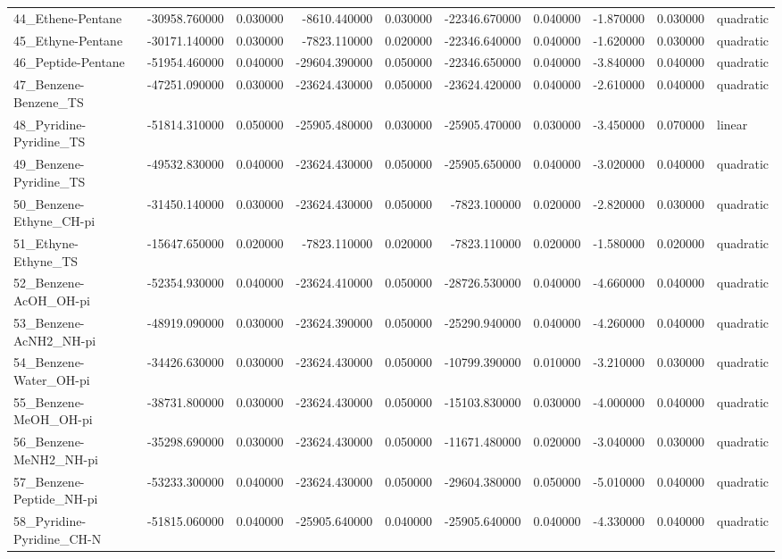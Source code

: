 \begin{tabular}{lrrrrrrrrl}
44_Ethene-Pentane & -30958.760000 & 0.030000 & -8610.440000 & 0.030000 & -22346.670000 & 0.040000 & -1.870000 & 0.030000 & quadratic \\
45_Ethyne-Pentane & -30171.140000 & 0.030000 & -7823.110000 & 0.020000 & -22346.640000 & 0.040000 & -1.620000 & 0.030000 & quadratic \\
46_Peptide-Pentane & -51954.460000 & 0.040000 & -29604.390000 & 0.050000 & -22346.650000 & 0.040000 & -3.840000 & 0.040000 & quadratic \\
47_Benzene-Benzene_TS & -47251.090000 & 0.030000 & -23624.430000 & 0.050000 & -23624.420000 & 0.040000 & -2.610000 & 0.040000 & quadratic \\
48_Pyridine-Pyridine_TS & -51814.310000 & 0.050000 & -25905.480000 & 0.030000 & -25905.470000 & 0.030000 & -3.450000 & 0.070000 & linear \\
49_Benzene-Pyridine_TS & -49532.830000 & 0.040000 & -23624.430000 & 0.050000 & -25905.650000 & 0.040000 & -3.020000 & 0.040000 & quadratic \\
50_Benzene-Ethyne_CH-pi & -31450.140000 & 0.030000 & -23624.430000 & 0.050000 & -7823.100000 & 0.020000 & -2.820000 & 0.030000 & quadratic \\
51_Ethyne-Ethyne_TS & -15647.650000 & 0.020000 & -7823.110000 & 0.020000 & -7823.110000 & 0.020000 & -1.580000 & 0.020000 & quadratic \\
52_Benzene-AcOH_OH-pi & -52354.930000 & 0.040000 & -23624.410000 & 0.050000 & -28726.530000 & 0.040000 & -4.660000 & 0.040000 & quadratic \\
53_Benzene-AcNH2_NH-pi & -48919.090000 & 0.030000 & -23624.390000 & 0.050000 & -25290.940000 & 0.040000 & -4.260000 & 0.040000 & quadratic \\
54_Benzene-Water_OH-pi & -34426.630000 & 0.030000 & -23624.430000 & 0.050000 & -10799.390000 & 0.010000 & -3.210000 & 0.030000 & quadratic \\
55_Benzene-MeOH_OH-pi & -38731.800000 & 0.030000 & -23624.430000 & 0.050000 & -15103.830000 & 0.030000 & -4.000000 & 0.040000 & quadratic \\
56_Benzene-MeNH2_NH-pi & -35298.690000 & 0.030000 & -23624.430000 & 0.050000 & -11671.480000 & 0.020000 & -3.040000 & 0.030000 & quadratic \\
57_Benzene-Peptide_NH-pi & -53233.300000 & 0.040000 & -23624.430000 & 0.050000 & -29604.380000 & 0.050000 & -5.010000 & 0.040000 & quadratic \\
58_Pyridine-Pyridine_CH-N & -51815.060000 & 0.040000 & -25905.640000 & 0.040000 & -25905.640000 & 0.040000 & -4.330000 & 0.040000 & quadratic \\

\end{tabular}
